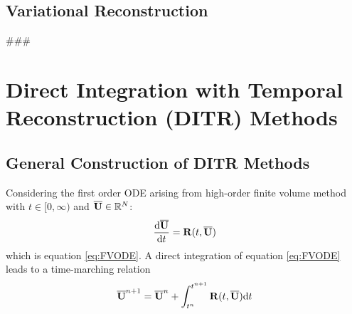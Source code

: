 \documentclass[preprint,12pt]{elsarticle}
\begin{document}
\subsection{Variational Reconstruction}
\label{ssec:VR}

\#\#\#


\section{Direct Integration with Temporal Reconstruction (DITR) Methods}
\label{sec:HIRK}

\subsection{General Construction of DITR Methods}

Considering the first order ODE arising
from high-order finite volume method
with
$t\in[0,\infty)$ and $\overline{\mathbf{U}}\in \mathbb{R}^N$:
\begin{equation*}
    \frac{\dd \overline{\mathbf{U}}}{\dd t} = \mathbf{R}(t, \overline{\mathbf{U}})
\end{equation*}
which is equation \eqref{eq:FVODE}.
A direct integration of equation \eqref{eq:FVODE}
leads to a time-marching relation
\begin{equation}
    \overline{\mathbf{U}}^{n+1} = \overline{\mathbf{U}}^{n} + \int_{t^n}^{t^{n+1}}{
    \mathbf{R}(t, \overline{\mathbf{U}}) \dd t
    }
    \label{eq:DI}
\end{equation}
\end{document}
